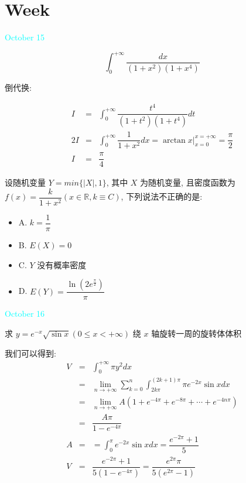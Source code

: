 \section{Week }
\textcolor{cyan}{October 15}

\begin{example}[][Exam: 36.3.1]
	$$\int_{0}^{+\infty}\dfrac{dx}{(1+x^2)(1+x^4)}$$
\end{example}

\begin{solution}

	倒代换:

	\begin{eqnarray*}
		I & = & \int_{0}^{+\infty}\dfrac{t^4}{(1+t^2)(1+t^4)}dt \\
	   2I & = & \int_{0}^{+\infty}\dfrac{1}{1+x^2}dx = \arctan x\big|_{x = 0}^{x = +\infty} = \dfrac{\pi}{2}\\
		I & = & \dfrac{\pi}{4}
	\end{eqnarray*}
\end{solution}

\begin{example}[][Exam: 36.3.2]
	设随机变量 $Y=min\{|X|,1\}$, 其中 $X$ 为随机变量, 且密度函数为 
	$f(x)=\dfrac{k}{1+x^2}(x\in \mathbb{R}, k\equiv C)$, 下列说法不正确的是:  
\begin{itemize}
	\item A. $k=\dfrac{1}{\pi}$
	\item B. $E(X)=0$
	\item C. $Y$ 没有概率密度
	\item D. $E(Y)=\dfrac{\ln(2e^{\frac{\pi}{2}})}{\pi}$
\end{itemize}
\end{example}

\begin{solution}
	
\end{solution}


\textcolor{cyan}{October 16}

\begin{example}[][Exam: 36.3.3]
	求 $y=e^{-x}\sqrt{\sin x}(0\leq x<+\infty)$ 绕 $x$ 轴旋转一周的旋转体体积
\end{example}
\begin{solution}

	我们可以得到:  
	\begin{eqnarray*}
		V&=&\int_{0}^{+\infty}\pi y^2dx\\
		&=&\lim\limits_{n\to+\infty}\sum\limits_{k=0}^{n}\int_{2k\pi}^{(2k+1)\pi}\pi e^{-2x}\sin xdx\\
		&=&\lim\limits_{n\to+\infty}A(1+e^{-4\pi}+e^{-8\pi}+\cdots+e^{-4n\pi})\\
		&=&\dfrac{A\pi}{1-e^{-4\pi}}\\
		A&=&=\int_{0}^{\pi}e^{-2x}\sin xdx=\dfrac{e^{-2\pi}+1}{5}\\
		V&=&\dfrac{e^{-2\pi}+1}{5(1-e^{-4\pi})}=\dfrac{e^{2\pi}\pi}{5(e^{2\pi}-1)}
	\end{eqnarray*}
\end{solution}

